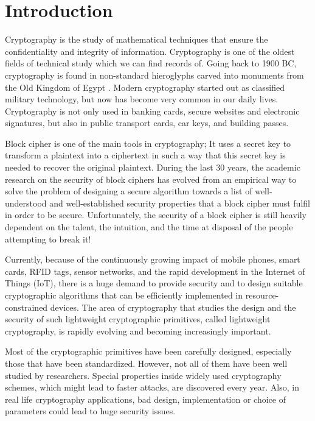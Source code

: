\chapter{Introduction}
\label{chapterlabel1}

Cryptography is the study of mathematical techniques that ensure the confidentiality and integrity of information. Cryptography is one of the oldest fields of technical study which we can find records of. Going back to 1900 BC,  cryptography is found in non-standard hieroglyphs carved into monuments from the Old Kingdom of Egypt \cite{kahn1996codebreakers}. Modern cryptography started out as classified military technology, but now has become very common in our daily lives. Cryptography is not only used in banking cards, secure websites and electronic signatures, but also in public transport cards, car keys, and building passes. 

Block cipher is one of the main tools in cryptography; It uses a secret key to transform a plaintext into a ciphertext in such a way that this secret key is needed to recover the original plaintext. During the last 30 years, the academic research on the security of block ciphers has evolved from an empirical way to solve the problem of designing a secure algorithm towards a list of well-understood and well-established  security properties that a block cipher must fulfil in order to be secure. Unfortunately, the  security of a block cipher is still heavily dependent on the talent, the intuition, and the time at disposal of the people attempting to break it!

Currently, because of the continuously growing impact of mobile phones, smart cards, RFID tags, sensor networks, and the rapid development in the Internet of Things (IoT), there is a huge demand to provide security and to design suitable cryptographic algorithms that can be efficiently implemented in resource-constrained devices. The area of cryptography that studies the design and the security of such lightweight cryptographic primitives, called lightweight cryptography, is rapidly evolving and becoming increasingly important. 

Most of the cryptographic primitives have been carefully designed, especially those that have been standardized. However, not all of them have been well studied by researchers. Special properties  inside widely used cryptography schemes, which might lead to faster attacks, are discovered every year. Also, in real life cryptography applications, bad design, implementation or choice of parameters could lead to huge security issues.

